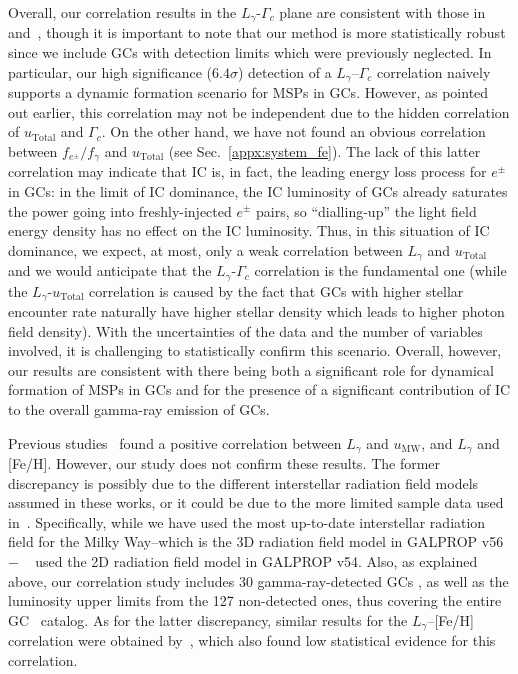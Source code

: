 \documentclass[doublespace,nopageskip]{VTthesis} %
\begin{document}
Overall, our correlation results in the $L_\gamma$-$\Gamma_c$ plane are consistent with those in \citet{2011ApJ...726..100H} and~\citet{2019MNRAS.486..851D}, though it is important to note that our method is more statistically robust since we include GCs with detection limits which were previously neglected. In particular, our high significance ($6.4\sigma$) detection of a $L_\gamma$--$\Gamma_c$ correlation naively supports a dynamic formation scenario for MSPs in GCs. However, as pointed out earlier, this correlation may not be independent due to the hidden correlation of $u_\mathrm{Total}$ and $\Gamma_c$. On the other hand, we have not found an obvious correlation between $f_{e^\pm}/f_\gamma$ and $u_\mathrm{Total}$ (see Sec.~\ref{appx:system_fe}). The lack of this latter correlation may indicate that IC is, in fact, the leading energy loss process for $e^\pm$ in GCs: in the limit of IC dominance, the IC luminosity of GCs already saturates the power going into freshly-injected $e^\pm$ pairs, so ``dialling-up'' the light field energy density has no effect on the IC luminosity. Thus, in this situation of IC dominance, we expect, at most, only a weak correlation between $L_\gamma$ and $u_\mathrm{Total}$ and we would anticipate that the $L_\gamma$-$\Gamma_c$ correlation is the fundamental one (while the $L_\gamma$-$u_\mathrm{Total}$ correlation is caused by the fact that GCs with higher stellar encounter rate naturally have higher stellar density which leads to higher photon field density). With the uncertainties of the data and the number of variables involved, it is challenging to statistically confirm this scenario. Overall, however, our results are consistent with there being both a significant role for dynamical formation of MSPs in GCs and for the presence of a significant contribution of IC to the overall gamma-ray emission of GCs.

Previous studies~\citep{2011ApJ...726..100H} found a positive correlation between $L_\gamma$ and $u_\mathrm{MW}$, and $L_\gamma$ and [Fe/H]. However, our study does not confirm these results. The former discrepancy is possibly due to the different interstellar radiation field models assumed in these works, or it could be due to the more limited sample data used in~\cite{2011ApJ...726..100H}. Specifically, while we have used the most up-to-date interstellar radiation field for the Milky Way--which is the 3D radiation field model in GALPROP v56~\citep{2017ApJ...846...67P}$-$ ~\citet{2011ApJ...726..100H} used the 2D radiation field model in GALPROP v54. Also, as explained above, our correlation study includes 30 gamma-ray-detected GCs , as well as the luminosity upper limits from the 127 non-detected ones, thus covering the entire GC~\citet{1996AJ....112.1487H} catalog. As for the latter discrepancy, similar results for the $L_\gamma$--[Fe/H] correlation were obtained by~\citet{2019MNRAS.486..851D}, which also found low statistical evidence for this correlation.
\end{document}

